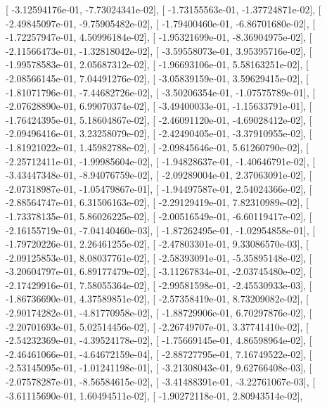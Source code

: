\documentclass{article}
\begin{document}
       [ -3.12594176e-01,  -7.73024341e-02],
       [ -1.73155563e-01,  -1.37724871e-02],
       [ -2.49845097e-01,  -9.75905482e-02],
       [ -1.79400460e-01,  -6.86701680e-02],
       [ -1.72257947e-01,   4.50996184e-02],
       [ -1.95321699e-01,  -8.36904975e-02],
       [ -2.11566473e-01,  -1.32818042e-02],
       [ -3.59558073e-01,   3.95395716e-02],
       [ -1.99578583e-01,   2.05687312e-02],
       [ -1.96693106e-01,   5.58163251e-02],
       [ -2.08566145e-01,   7.04491276e-02],
       [ -3.05839159e-01,   3.59629415e-02],
       [ -1.81071796e-01,  -7.44682726e-02],
       [ -3.50206354e-01,  -1.07575789e-01],
       [ -2.07628890e-01,   6.99070374e-02],
       [ -3.49400033e-01,  -1.15633791e-01],
       [ -1.76424395e-01,   5.18604867e-02],
       [ -2.46091120e-01,  -4.69028412e-02],
       [ -2.09496416e-01,   3.23258079e-02],
       [ -2.42490405e-01,  -3.37910955e-02],
       [ -1.81921022e-01,   1.45982788e-02],
       [ -2.09845646e-01,   5.61260790e-02],
       [ -2.25712411e-01,  -1.99985604e-02],
       [ -1.94828637e-01,  -1.40646791e-02],
       [ -3.43447348e-01,  -8.94076759e-02],
       [ -2.09289004e-01,   2.37063091e-02],
       [ -2.07318987e-01,  -1.05479867e-01],
       [ -1.94497587e-01,   2.54024366e-02],
       [ -2.88564747e-01,   6.31506163e-02],
       [ -2.29129419e-01,   7.82310989e-02],
       [ -1.73378135e-01,   5.86026225e-02],
       [ -2.00516549e-01,  -6.60119417e-02],
       [ -2.16155719e-01,  -7.04140460e-03],
       [ -1.87262495e-01,  -1.02954858e-01],
       [ -1.79720226e-01,   2.26461255e-02],
       [ -2.47803301e-01,   9.33086570e-03],
       [ -2.09125853e-01,   8.08037761e-02],
       [ -2.58393091e-01,  -5.35895148e-02],
       [ -3.20604797e-01,   6.89177479e-02],
       [ -3.11267834e-01,  -2.03745480e-02],
       [ -2.17429916e-01,   7.58055364e-02],
       [ -2.99581598e-01,  -2.45530933e-03],
       [ -1.86736690e-01,   4.37589851e-02],
       [ -2.57358419e-01,   8.73209082e-02],
       [ -2.90174282e-01,  -4.81770958e-02],
       [ -1.88729906e-01,   6.70297876e-02],
       [ -2.20701693e-01,   5.02514456e-02],
       [ -2.26749707e-01,   3.37741410e-02],
       [ -2.54232369e-01,  -4.39524178e-02],
       [ -1.75669145e-01,   4.86598964e-02],
       [ -2.46461066e-01,  -4.64672159e-04],
       [ -2.88727795e-01,   7.16749522e-02],
       [ -2.53145095e-01,  -1.01241198e-01],
       [ -3.21308043e-01,   9.62766408e-03],
       [ -2.07578287e-01,  -8.56584615e-02],
       [ -3.41488391e-01,  -3.22761067e-03],
       [ -3.61115690e-01,   1.60494511e-02],
       [ -1.90272118e-01,   2.80943514e-02],
\end{document}
